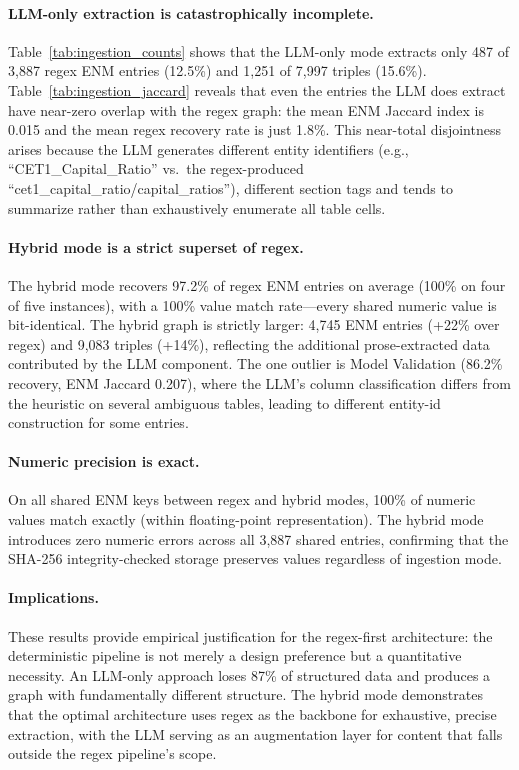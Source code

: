 \documentclass[11pt]{article}
\begin{document}
\paragraph{LLM-only extraction is catastrophically incomplete.}
Table~\ref{tab:ingestion_counts} shows that the LLM-only mode extracts
only 487 of 3{,}887 regex ENM entries (12.5\%) and 1{,}251 of 7{,}997
triples (15.6\%).  Table~\ref{tab:ingestion_jaccard} reveals that even
the entries the LLM does extract have near-zero overlap with the regex
graph: the mean ENM Jaccard index is 0.015 and the mean regex recovery
rate is just 1.8\%.  This near-total disjointness arises because the
LLM generates different entity identifiers (e.g., ``CET1\_Capital\_Ratio''
vs.\ the regex-produced ``cet1\_capital\_ratio/capital\_ratios''),
different section tags and tends to summarize rather than exhaustively
enumerate all table cells.

\paragraph{Hybrid mode is a strict superset of regex.}
The hybrid mode recovers 97.2\% of regex ENM entries on average
(100\% on four of five instances), with a 100\% value match rate---every
shared numeric value is bit-identical.  The hybrid graph is strictly
larger: 4{,}745 ENM entries (+22\% over regex) and 9{,}083 triples
(+14\%), reflecting the additional prose-extracted data contributed by
the LLM component.  The one outlier is Model Validation (86.2\%
recovery, ENM Jaccard 0.207), where the LLM's column classification
differs from the heuristic on several ambiguous tables, leading to
different entity-id construction for some entries.

\paragraph{Numeric precision is exact.}
On all shared ENM keys between regex and hybrid modes, 100\% of
numeric values match exactly (within floating-point representation).
The hybrid mode introduces zero numeric errors across all 3{,}887
shared entries, confirming that the SHA-256 integrity-checked storage
preserves values regardless of ingestion mode.

\paragraph{Implications.}
These results provide empirical justification for the regex-first
architecture: the deterministic pipeline is not merely a design
preference but a quantitative necessity.  An LLM-only approach loses
87\% of structured data and produces a graph with fundamentally
different structure.  The hybrid mode demonstrates that the optimal
architecture uses regex as the backbone for exhaustive, precise
extraction, with the LLM serving as an augmentation layer for
content that falls outside the regex pipeline's scope.
\end{document}
